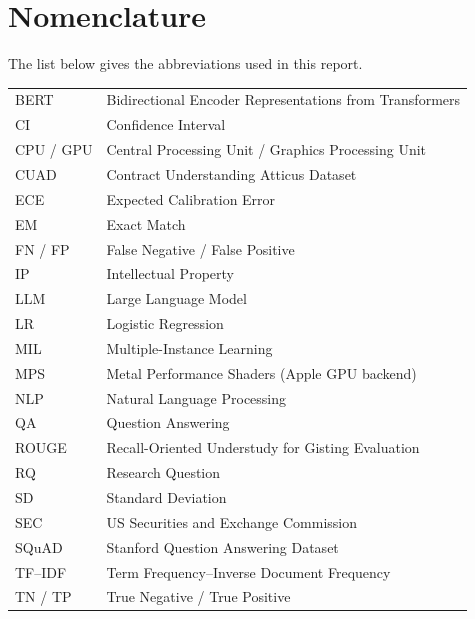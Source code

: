\chapter*{Nomenclature}
The list below gives the abbreviations used in this report.

\vspace{0.5cm}
\begin{tabular}{p{3cm} p{11cm}}
BERT & Bidirectional Encoder Representations from Transformers\\
CI & Confidence Interval\\
CPU / GPU & Central Processing Unit / Graphics Processing Unit\\
CUAD & Contract Understanding Atticus Dataset\\
ECE & Expected Calibration Error\\
EM & Exact Match\\
FN / FP & False Negative / False Positive\\
IP & Intellectual Property\\
LLM & Large Language Model\\
LR & Logistic Regression\\
MIL & Multiple-Instance Learning\\
MPS & Metal Performance Shaders (Apple GPU backend)\\
NLP & Natural Language Processing\\
QA & Question Answering\\
ROUGE & Recall-Oriented Understudy for Gisting Evaluation\\
RQ & Research Question\\
SD & Standard Deviation\\
SEC & US Securities and Exchange Commission\\
SQuAD & Stanford Question Answering Dataset\\
TF--IDF & Term Frequency--Inverse Document Frequency\\
TN / TP & True Negative / True Positive\\
\end{tabular}


